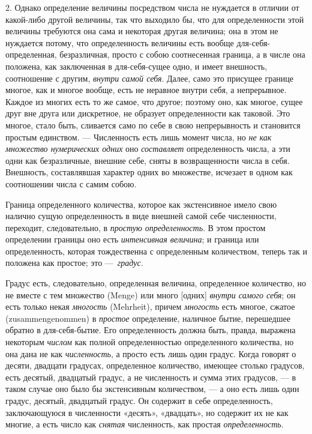 2. Однако определение величины посредством числа не нуждается в отличии от
какой-либо другой величины, так что выходило бы, что для определенности
этой величины требуются она сама и некоторая другая величина; она в этом не
нуждается потому, что определенность величины есть вообще
для-себя-определенная, безразличная, просто с собою соотнесенная граница, а
в числе она положена, как заключенная в для-себя-сущее одно, и имеет
внешность, соотношение с другим, {\em внутри самой
себя}. Далее, само это присущее границе многое, как и многое вообще, есть
не неравное внутри себя, а непрерывное. Каждое из многих есть то же самое,
что другое; поэтому оно, как многое, сущее друг вне друга или дискретное,
не образует определенности как таковой. Это многое, стало быть, сливается
само по себе в свою непрерывность и становится простым единством. —
Численность есть лишь момент числа, но {\em не как
множество нумерических одних} оно {\em составляет}
определенность числа, а эти одни как безразличные, внешние себе, сняты в
возвращенности числа в себя. Внешность, составлявшая характер одних во
множестве, исчезает в одном как соотношении числа с самим собою.

Граница определенного количества, которое как экстенсивное имело свою
налично сущую определенность в виде внешней самой себе численности,
переходит, следовательно, в {\em простую
определенность}. В этом простом определении границы оно есть
{\em интенсивная величина}; и граница или
определенность, которая тождественна с определенным количеством, теперь так
и положена как простое; это —~{\em градус}.

Градус есть, следовательно, определенная величина, определенное количество,
но не вместе с тем множество (Menge) или много [одних]
{\em внутри самого себя}; он есть только некая
{\em многость} (Mehrheit), причем
{\em многость} есть многое, сжатое (zusammengenommen) в
{\em простое} определение, наличное бытие, перешедшее
обратно в для-себя-бытие. Его определенность должна быть, правда, выражена
некоторым {\em числом} как полной определенностью
определенного количества, но она дана не как
{\em численность}, а просто есть лишь один градус.
Когда говорят о десяти, двадцати градусах, определенное количество, имеющее
столько градусов, есть десятый, двадцатый градус, а не численность и сумма
этих градусов, — в таком случае оно было бы экстенсивным количеством, — а
оно есть лишь один градус, десятый, двадцатый градус. Он содержит в себе
определенность, заключающуюся в численности «десять», «двадцать», но
содержит их не как многие, а есть число как
{\em снятая} численность, как простая
{\em определенность}.

